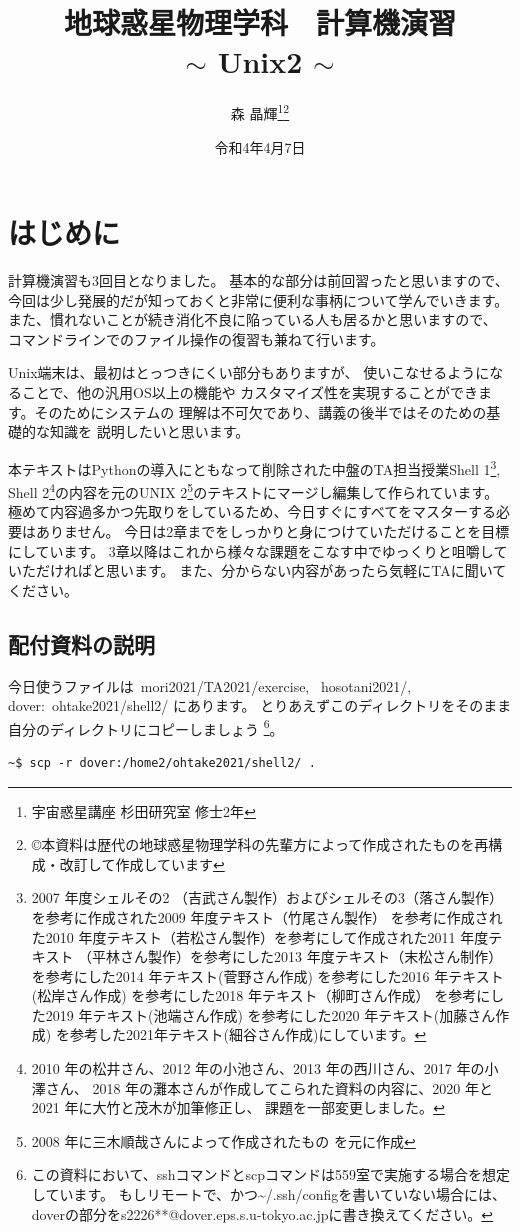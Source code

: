 \documentclass[a4j]{ltjsreport}
\title{\textbf{地球惑星物理学科　計算機演習}\\
$\sim$ Unix2 $\sim$}
\author{森 晶輝\thanks{宇宙惑星講座 杉田研究室 修士2年}\footnote{\copyright 本資料は歴代の地球惑星物理学科の先輩方によって作成されたものを再構成・改訂して作成しています}}
\date{令和4年4月7日}
\begin{document}
    \maketitle

    \chapter*{はじめに}
    計算機演習も3回目となりました。
    基本的な部分は前回習ったと思いますので、
    今回は少し発展的だが知っておくと非常に便利な事柄について学んでいきます。
    また、慣れないことが続き消化不良に陥っている人も居るかと思いますので、
    コマンドラインでのファイル操作の復習も兼ねて行います。

    Unix端末は、最初はとっつきにくい部分もありますが、
    使いこなせるようになることで、他の汎用OS以上の機能や
    カスタマイズ性を実現することができます。そのためにシステムの
    理解は不可欠であり、講義の後半ではそのための基礎的な知識を
    説明したいと思います。

    本テキストはPythonの導入にともなって削除された中盤のTA担当授業Shell 1\footnote{2007 年度シェルその2
    （吉武さん製作）およびシェルその3（落さん製作）を参考に作成された2009 年度テキスト（竹尾さん製作）
    を参考に作成された2010 年度テキスト（若松さん製作）を参考にして作成された2011 年度テキスト
    （平林さん製作）を参考にした2013 年度テキスト（末松さん制作）を参考にした2014 年テキスト(菅野さん作成)
    を参考にした2016 年テキスト(松岸さん作成) を参考にした2018 年テキスト（柳町さん作成）
    を参考にした2019 年テキスト(池端さん作成) を参考にした2020 年テキスト(加藤さん作成) 
    を参考した2021年テキスト(細谷さん作成)にしています。}, 
    Shell 2\footnote{2010 年の松井さん、2012 年の小池さん、2013 年の西川さん、2017 年の小澤さん、
    2018 年の灘本さんが作成してこられた資料の内容に、2020 年と2021 年に大竹と茂木が加筆修正し、
    課題を一部変更しました。}の内容を元のUNIX 2\footnote{2008 年に三木順哉さんによって作成されたもの
    を元に作成}のテキストにマージし編集して作られています。
    極めて内容過多かつ先取りをしているため、今日すぐにすべてをマスターする必要はありません。
    今日は2章までをしっかりと身につけていただけることを目標にしています。
    3章以降はこれから様々な課題をこなす中でゆっくりと咀嚼していただければと思います。
    また、分からない内容があったら気軽にTAに聞いてください。

    \section*{配付資料の説明}
    今日使うファイルは~mori2021/TA2021/exercise, ~hosotani2021/, dover:~ohtake2021/shell2/ にあります。
    とりあえずこのディレクトリをそのまま自分のディレクトリにコピーしましょう
    \footnote{この資料において、sshコマンドとscpコマンドは559室で実施する場合を想定しています。
    もしリモートで、かつ\textasciitilde/.ssh/configを書いていない場合には、
    doverの部分をs2226**@dover.eps.s.u-tokyo.ac.jpに書き換えてください。}。
    \begin{lstlisting}[numbers=none]
    ~$ scp -r dover:/home2/ohtake2021/shell2/ .
    \end{lstlisting}
\end{document}
